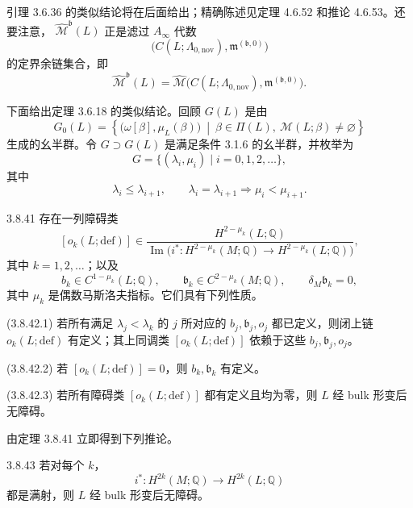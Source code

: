 引理 3.6.36 的类似结论将在后面给出；精确陈述见定理 4.6.52 和推论
4.6.53。还要注意，
$\widehat{\mathcal M}^{\mathfrak b}(L)$ 正是滤过 $A_\infty$ 代数
\[
 \bigl(C(L;\Lambda_{0,\mathrm{nov}}),
 \mathfrak m^{(\mathfrak b,0)}\bigr)
\]
的定界余链集合，即
\[
 \widehat{\mathcal M}^{\mathfrak b}(L)
 =
 \widehat{\mathcal M}\bigl(
 C(L;\Lambda_{0,\mathrm{nov}}),
 \mathfrak m^{(\mathfrak b,0)}
 \bigr).
\]

下面给出定理 3.6.18 的类似结论。回顾 $G(L)$ 是由
\[
 G_0(L)
 =
 \left\{
 \bigl(\omega[\beta],\mu_L(\beta)\bigr)
 \ \middle|\
 \beta\in\Pi(L),\ 
 \mathcal M(L;\beta)\ne\varnothing
 \right\}
\]
生成的幺半群。令 $G\supset G(L)$ 是满足条件 3.1.6 的幺半群，并枚举为
\[
 G=\{(\lambda_i,\mu_i)\mid i=0,1,2,\ldots\},
\]
其中
\[
 \lambda_i\leq\lambda_{i+1},
 \qquad
 \lambda_i=\lambda_{i+1}\Longrightarrow\mu_i<\mu_{i+1}.
\]

\begin{theorem}{3.8.41}\label{thm:3-8-41}
存在一列障碍类
\[
 [o_k(L;\mathrm{def})]
 \in
 \frac{H^{2-\mu_k}(L;\mathbb Q)}
 {\operatorname{Im}\bigl(
 i^*\colon H^{2-\mu_k}(M;\mathbb Q)
 \longrightarrow H^{2-\mu_k}(L;\mathbb Q)
 \bigr)},
\]
其中 $k=1,2,\ldots$；以及
\[
 b_k\in C^{1-\mu_k}(L;\mathbb Q),
 \qquad
 \mathfrak b_k\in C^{2-\mu_k}(M;\mathbb Q),
 \qquad
 \delta_M\mathfrak b_k=0,
\]
其中 $\mu_k$ 是偶数马斯洛夫指标。它们具有下列性质。

\smallskip
\noindent\textup{(3.8.42.1)}
若所有满足 $\lambda_j<\lambda_k$ 的 $j$ 所对应的
$b_j,\mathfrak b_j,o_j$ 都已定义，则闭上链
$o_k(L;\mathrm{def})$ 有定义；其上同调类
$[o_k(L;\mathrm{def})]$ 依赖于这些
$b_j,\mathfrak b_j,o_j$。

\noindent\textup{(3.8.42.2)}
若 $[o_k(L;\mathrm{def})]=0$，则
$b_k,\mathfrak b_k$ 有定义。

\noindent\textup{(3.8.42.3)}
若所有障碍类 $[o_k(L;\mathrm{def})]$ 都有定义且均为零，则
$L$ 经 bulk 形变后无障碍。
\end{theorem}

由定理 3.8.41 立即得到下列推论。

\begin{corollary}{3.8.43}\label{cor:3-8-43}
若对每个 $k$，
\[
 i^*\colon H^{2k}(M;\mathbb Q)
 \longrightarrow H^{2k}(L;\mathbb Q)
\]
都是满射，则 $L$ 经 bulk 形变后无障碍。
\end{corollary}

